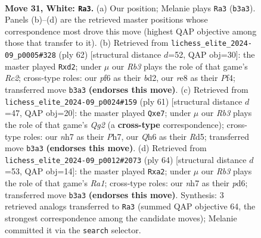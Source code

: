 \documentclass[11pt]{article}
\begin{document}
\clearpage

\begin{figure}[p]\centering
\begin{subfigure}{0.46\textwidth}\centering
\resizebox{\linewidth}{!}{%
\newchessgame
\chessboard[
  setfen={4r2k/p1pp3n/5p1Q/8/1PPP4/1R6/2q2P1P/6K1 w - - 0 31},
  showmover=false,
  pgfstyle=straightmove, color=movearrow, markmove={b3-a3}
]}
\caption{}
\end{subfigure}\hfill
\begin{subfigure}{0.46\textwidth}\centering
\resizebox{\linewidth}{!}{%
\newchessgame
\chessboard[
  setfen={4r1k1/5p2/5p2/1p1p3Q/5P2/1P4PP/2Rb3K/1q6 w - - 0 32},
  showmover=false,
  pgfstyle=straightmove, color=movearrow, markmove={c2-d2}
]}
\caption{}
\end{subfigure}
\\[4pt]
\begin{subfigure}{0.46\textwidth}\centering
\resizebox{\linewidth}{!}{%
\newchessgame
\chessboard[
  setfen={6k1/pp2Q1qp/6p1/2pr4/8/1P6/P5PP/1K2R3 b - - 0 31},
  showmover=false,
  pgfstyle=straightmove, color=movearrow, markmove={g7-e7}
]}
\caption{}
\end{subfigure}\hfill
\begin{subfigure}{0.46\textwidth}\centering
\resizebox{\linewidth}{!}{%
\newchessgame
\chessboard[
  setfen={1r4k1/4Qp2/3p3p/8/3P4/2q4P/p4PP1/R5K1 w - - 0 33},
  showmover=false,
  pgfstyle=straightmove, color=movearrow, markmove={a1-a2}
]}
\caption{}
\end{subfigure}
\caption{\textbf{Move 31, White: \texttt{Ra3}.} (a) Our position; Melanie plays \texttt{Ra3} (\texttt{b3a3}). Panels (b)--(d) are the retrieved master positions whose correspondence most drove this move (highest QAP objective among those that transfer to it). (b) Retrieved from \texttt{lichess\_elite\_2024-09\_p0005\#328} (ply 62) [structural distance $d$=52, QAP obj=30]: the master played \texttt{Rxd2}; under $\mu$ our \emph{Rb3} plays the role of that game's \emph{Rc2}; cross-type roles: our \emph{p}f6 as their \emph{b}d2, our \emph{r}e8 as their \emph{P}f4; transferred move \texttt{b3a3} \textbf{(endorses this move)}. (c) Retrieved from \texttt{lichess\_elite\_2024-09\_p0024\#159} (ply 61) [structural distance $d$=47, QAP obj=20]: the master played \texttt{Qxe7}; under $\mu$ our \emph{Rb3} plays the role of that game's \emph{Qg2} (a \textbf{cross-type} correspondence); cross-type roles: our \emph{n}h7 as their \emph{P}h7, our \emph{Q}h6 as their \emph{R}d5; transferred move \texttt{b3a3} \textbf{(endorses this move)}. (d) Retrieved from \texttt{lichess\_elite\_2024-09\_p0012\#2073} (ply 64) [structural distance $d$=53, QAP obj=14]: the master played \texttt{Rxa2}; under $\mu$ our \emph{Rb3} plays the role of that game's \emph{Ra1}; cross-type roles: our \emph{n}h7 as their \emph{p}d6; transferred move \texttt{b3a3} \textbf{(endorses this move)}. Synthesis: 3 retrieved analogs transferred to \texttt{Ra3} (summed QAP objective 64, the strongest correspondence among the candidate moves); Melanie committed it via the \texttt{search} selector.}
\label{fig:thought-m60}
\end{figure}
\end{document}
